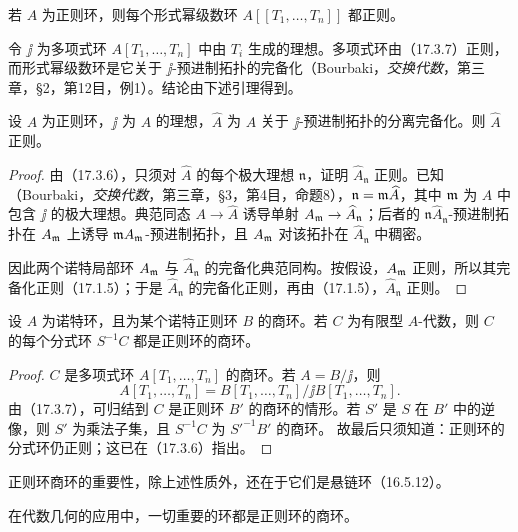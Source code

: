 若 $A$ 为正则环，则每个形式幂级数环 $A[[T_1,\ldots,T_n]]$ 都正则。

令 $\jj$ 为多项式环 $A[T_1,\ldots,T_n]$ 中由 $T_i$ 生成的理想。多项式环由（17.3.7）正则，而形式幂级数环是它关于 $\jj$-预进制拓扑的完备化（Bourbaki，\textit{交换代数}，第三章，§2，第12目，例1）。结论由下述引理得到。

设 $A$ 为正则环，$\jj$ 为 $A$ 的理想，$\widehat A$ 为 $A$ 关于 $\jj$-预进制拓扑的分离完备化。则 $\widehat A$ 正则。
\begin{proof}
由（17.3.6），只须对 $\widehat A$ 的每个极大理想 $\mathfrak n$，证明 $\widehat A_{\mathfrak n}$ 正则。已知（Bourbaki，\textit{交换代数}，第三章，§3，第4目，命题8），$\mathfrak n=\mathfrak m\widehat A$，其中 $\mathfrak m$ 为 $A$ 中包含 $\jj$ 的极大理想。典范同态 $A\to\widehat A$ 诱导单射
$A_{\mathfrak m}\to\widehat A_{\mathfrak n}$；后者的 $\mathfrak n\widehat A_{\mathfrak n}$-预进制拓扑在 $A_{\mathfrak m}$ 上诱导 $\mathfrak m A_{\mathfrak m}$-预进制拓扑，且 $A_{\mathfrak m}$ 对该拓扑在 $\widehat A_{\mathfrak n}$ 中稠密。

因此两个诺特局部环 $A_{\mathfrak m}$ 与 $\widehat A_{\mathfrak n}$ 的完备化典范同构。按假设，$A_{\mathfrak m}$ 正则，所以其完备化正则（17.1.5）；于是 $\widehat A_{\mathfrak n}$ 的完备化正则，再由（17.1.5），$\widehat A_{\mathfrak n}$ 正则。
\end{proof}

设 $A$ 为诺特环，且为某个诺特正则环 $B$ 的商环。若 $C$ 为有限型 $A$-代数，则 $C$ 的每个分式环 $S^{-1}C$ 都是正则环的商环。
\begin{proof}
$C$ 是多项式环 $A[T_1,\ldots,T_n]$ 的商环。若 $A=B/\jj$，则
\[
 A[T_1,\ldots,T_n]
 =B[T_1,\ldots,T_n]/\jj B[T_1,\ldots,T_n].
\]
由（17.3.7），可归结到 $C$ 是正则环 $B'$ 的商环的情形。若 $S'$ 是 $S$ 在 $B'$ 中的逆像，则 $S'$ 为乘法子集，且 $S^{-1}C$ 为 $S'^{-1}B'$ 的商环。
故最后只须知道：正则环的分式环仍正则；这已在（17.3.6）指出。
\end{proof}
正则环商环的重要性，除上述性质外，还在于它们是悬链环（16.5.12）。

在代数几何的应用中，一切重要的环都是正则环的商环。
